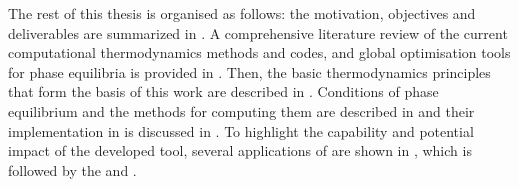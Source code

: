 	The rest of this thesis is organised as follows: the motivation, objectives and deliverables are summarized in . A comprehensive literature review of the current computational thermodynamics methods and codes, and global optimisation tools for phase equilibria is provided in .  Then, the basic thermodynamics principles that form the basis of this work are described in . Conditions of phase equilibrium and the methods for computing them are described in  and their implementation in {\GEM} is discussed in . To highlight the capability and potential impact of the developed tool, several applications of {\GEM} are shown in , which is followed by the  and . 